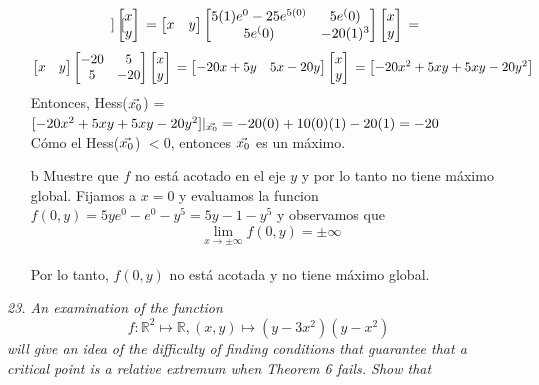 \documentclass[a4paper,12pt]{article}
\begin{document}
\begin{itemize}
\[\begin{bmatrix}
	\end{bmatrix}
	\begin{bmatrix}
	x \\ y
	\end{bmatrix}\\
	= 
	\begin{bmatrix}
	x & y
	\end{bmatrix}
	\begin{bmatrix}
	    5(1)e^0 - 25e^{5(0)} & 5e^(0)\\
		5e^(0) & -20(1)^3\\
	\end{bmatrix} 
	\begin{bmatrix}
	x \\ y
	\end{bmatrix}\\
	=
	\]
	\[
	\begin{bmatrix}
	x & y
	\end{bmatrix}
	\begin{bmatrix}
	    -20 & 5\\
		5 & -20\\
	\end{bmatrix}
	\begin{bmatrix}
	x \\ y
	\end{bmatrix}\\
	= 
	\begin{bmatrix}
	-20x + 5y & 5x - 20y
	\end{bmatrix}
	\begin{bmatrix}
	x \\ y
	\end{bmatrix}\\
	=
	\begin{bmatrix}
	-20x^2+5xy+5xy-20y^2
	\end{bmatrix}
	\]
	Entonces, Hess($\vec{x_0}$) = $[-20x^2+5xy+5xy-20y^2]|_{\vec{x_0}} = -20(0)+10(0)(1)-20(1) = -20$\\
	Cómo el Hess($\vec{x_0}$) $< 0$, entonces $\vec{x_0}$ es un máximo.
	\item[b] Muestre que $f$ no está acotado en el eje $y$ y por lo tanto no tiene máximo global.
	Fijamos a $x = 0$ y evaluamos la funcion $f(0,y)= 5ye^0-e^0-y^5 = 5y-1-y^5$ y observamos que \[ \lim_{x \to \pm \infty} f(0,y) = \pm \infty \]\\
	Por lo tanto, $f(0,y)$ no está acotada y no tiene máximo global.
	
\end{itemize}

\textit{23. An examination of the function}
	$$f:\mathbb{R}^2 \mapsto \mathbb{R}, (x, y) \mapsto (y -3x^2)(y -x^2)$$
	\textit{will give an idea of the difficulty of finding conditions that
			guarantee that a critical point is a relative extremum when Theorem
			6 fails. Show that}\\
\end{document}
